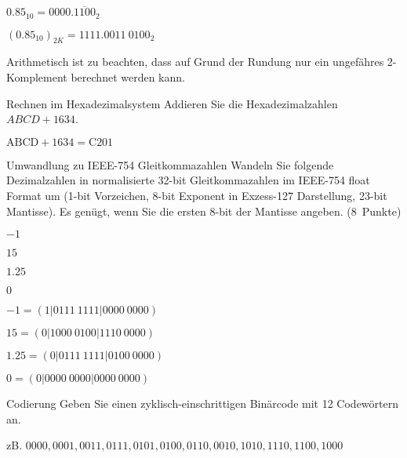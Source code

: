 \documentclass{exercisesheet}
\begin{document}
\begin{solutions}
  \item $0.85_{10} = {0000.\overline{1100}}_2$
  \item $ (0.85_{10})_{2K} = {1111.0011\ 0100}_2$
  \item Arithmetisch ist zu beachten, dass auf Grund der Rundung nur ein ungefähres 2-Komplement berechnet werden kann.
\end{solutions}

\begin{exercise}{Rechnen im Hexadezimalsystem}
  Addieren Sie die Hexadezimalzahlen $ABCD + 1634$.\points[4]

  \begin{solution}
    $\mathrm{ABCD} + \mathrm{1634} = \mathrm{C201}$
  \end{solution}
\end{exercise}

\begin{eexercises}{Umwandlung zu IEEE-754 Gleitkommazahlen}{
    Wandeln Sie folgende Dezimalzahlen in normalisierte 32-bit Gleitkommazahlen im IEEE-754 float Format um (1-bit Vorzeichen, 8-bit Exponent in Exzess-127 Darstellung, 23-bit Mantisse). Es genügt, wenn Sie die ersten 8-bit der Mantisse angeben. (8~Punkte)
  }
  \item $-1$
  \item $15$
  \item $1.25$
  \item $0$
\end{eexercises}

\begin{solutions}
  \item $-1 = (1|0111\ 1111|0000\ 0000)$
  \item $15 = (0|1000\ 0100|1110\ 0000)$
  \item $1.25 = (0|0111\ 1111|0100\ 0000)$
  \item $0 = (0|0000\ 0000|0000\ 0000)$
\end{solutions}

\begin{exercise}{Codierung}
  Geben Sie einen zyklisch-einschrittigen Binärcode mit 12 Codewörtern an.\points[5]

  \begin{solution}
    zB. $0000, 0001, 0011, 0111, 0101, 0100, 0110, 0010, 1010, 1110, 1100, 1000$
  \end{solution}
\end{exercise}
\end{document}
